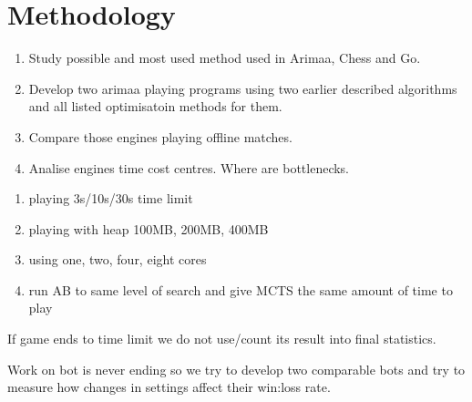 \chapter{Methodology}
\begin{enumerate}%
\item Study possible and most used method used in Arimaa, Chess and Go.
\item Develop two arimaa playing programs using two earlier described
	  algorithms and all listed optimisatoin methods for them.
\item Compare those engines playing offline matches.
\item Analise engines time cost centres. Where are bottlenecks.
\end{enumerate}

\begin{enumerate}
\item playing 3s/10s/30s time limit
\item playing with heap 100MB, 200MB, 400MB
\item using one, two, four, eight cores
\item run AB to same level of search and give MCTS the same amount of time to play
\end{enumerate}
If game ends to time limit we do not use/count its result into final statistics.

Work on bot is never ending so we try to develop two comparable bots and try to
measure how changes in settings affect their win:loss rate.
